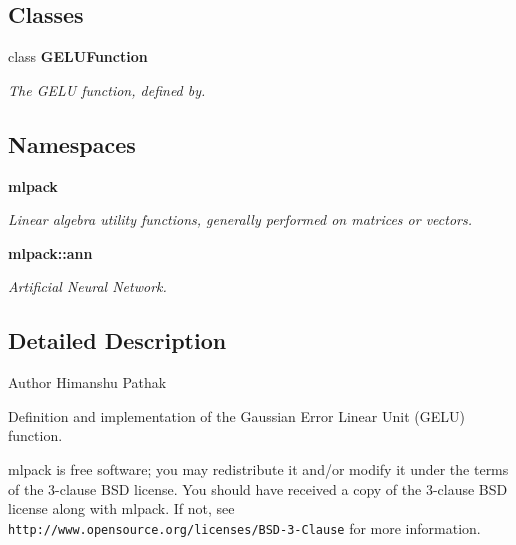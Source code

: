 \subsection*{Classes}
\begin{DoxyCompactItemize}
\item 
class \textbf{ G\+E\+L\+U\+Function}
\begin{DoxyCompactList}\small\item\em The G\+E\+LU function, defined by. \end{DoxyCompactList}\end{DoxyCompactItemize}
\subsection*{Namespaces}
\begin{DoxyCompactItemize}
\item 
 \textbf{ mlpack}
\begin{DoxyCompactList}\small\item\em Linear algebra utility functions, generally performed on matrices or vectors. \end{DoxyCompactList}\item 
 \textbf{ mlpack\+::ann}
\begin{DoxyCompactList}\small\item\em Artificial Neural Network. \end{DoxyCompactList}\end{DoxyCompactItemize}


\subsection{Detailed Description}
\begin{DoxyAuthor}{Author}
Himanshu Pathak
\end{DoxyAuthor}
Definition and implementation of the Gaussian Error Linear Unit (G\+E\+LU) function.

mlpack is free software; you may redistribute it and/or modify it under the terms of the 3-\/clause B\+SD license. You should have received a copy of the 3-\/clause B\+SD license along with mlpack. If not, see {\tt http\+://www.\+opensource.\+org/licenses/\+B\+S\+D-\/3-\/\+Clause} for more information. 